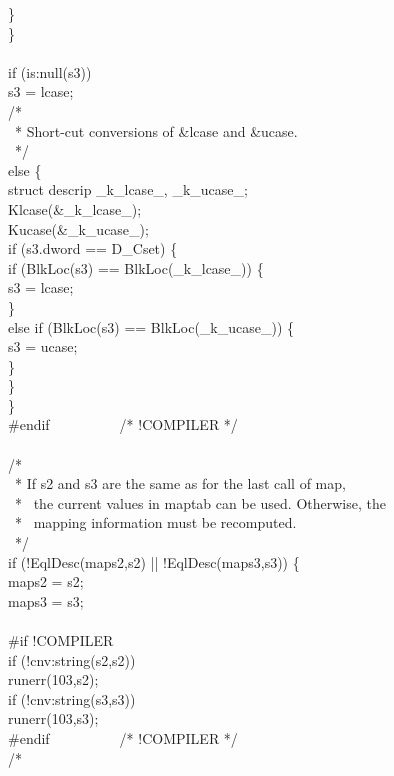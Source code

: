 {\>\>\}\\
\>\}\\
\\
\>\>if (is:null(s3))\\
\>\>\>s3 = lcase;\\
\>\>/*\\
\>\>\ * Short-cut conversions of \&lcase and \&ucase.\\
\>\>\ */\\
\>\>else \{\\
\>\>\>struct descrip \_k\_lcase\_, \_k\_ucase\_;\\
\>\>\>Klcase(\&\_k\_lcase\_);\\
\>\>\>Kucase(\&\_k\_ucase\_);\\
\>\>\>if (s3.dword == D\_Cset) \{\\
\>\>\>\>if (BlkLoc(s3) == BlkLoc(\_k\_lcase\_)) \{\\
\>\>\>\>\>s3 = lcase;\\
\>\>\>\>\>\}\\
\>\>\>\>else if (BlkLoc(s3) == BlkLoc(\_k\_ucase\_)) \{\\
\>\>\>\>\>s3 = ucase;\\
\>\>\>\>\>\}\\
\>\>\>\>\}\\
\>\>\>\}\\
\#endif\ \ \ \ \ \ \ \ \ \ /* !COMPILER */\\
\\
\>\>/*\\
\>\>\ * If s2 and s3 are the same as for the last call of map,\\
\>\>\ * \ the current values in maptab can be used. Otherwise, the\\
\>\>\ * \ mapping information must be recomputed.\\
\>\>\ */\\
\>\>if (!EqlDesc(maps2,s2) || !EqlDesc(maps3,s3)) \{\\
\>\>\>maps2 = s2;\\
\>\>\>maps3 = s3;\\
\\
\#if !COMPILER\\
\>\>\>if (!cnv:string(s2,s2))\\
\>\>\>\>runerr(103,s2);\\
\>\>\>if (!cnv:string(s3,s3))\\
\>\>\>\>runerr(103,s3);\\
\#endif\ \ \ \ \ \ \ \ \ \ /* !COMPILER */\\
\>\>\>/*\\
}
